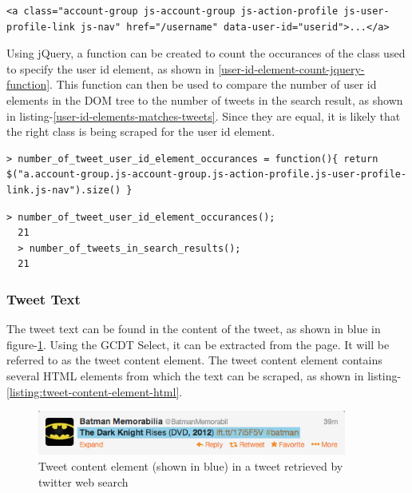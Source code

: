 \begin{lstlisting}[caption={HTML of the user id element in a tweet},label={listing:user-id-element-html},captionpos=b]
  <a class="account-group js-account-group js-action-profile js-user-profile-link js-nav" href="/username" data-user-id="userid">...</a>
\end{lstlisting}

\noindent
Using jQuery, a function can be created to count the occurances of the class used to specify the user id element, as shown in \ref{user-id-element-count-jquery-function}. This function can then be used to compare the number of user id elements in the DOM tree to the number of tweets in the search result, as shown in listing-\ref{user-id-elements-matches-tweets}. Since they are equal, it is likely that the right class is being scraped for the user id element.

\begin{lstlisting}[caption={Creating a function in GCDT Javascript Console for counting the occurance of user id elements on the twitter search result page},label={user-id-element-count-jquery-function},captionpos=b]
  > number_of_tweet_user_id_element_occurances = function(){ return $("a.account-group.js-account-group.js-action-profile.js-user-profile-link.js-nav").size() }
\end{lstlisting}

\begin{lstlisting}[caption={Running functions in GCDT Javascript Console to show that the number of user id elements matches the number of tweets},label={user-id-elements-matches-tweets},captionpos=b]
  > number_of_tweet_user_id_element_occurances();
  21
  > number_of_tweets_in_search_results();
  21
\end{lstlisting}

\subsubsection{Tweet Text}
The tweet text can be found in the content of the tweet, as shown in blue in figure-\ref{figure:tweet-text-field}. Using the GCDT Select, it can be extracted from the page. It will be referred to as the tweet content element. The tweet content element contains several HTML elements from which the text can be scraped, as shown in listing-\ref{listing:tweet-content-element-html}.

  \begin{figure}[H]
\includegraphics[width=4in]{image/tweet-text-and-url-field.png}
\centering
\caption{Tweet content element (shown in blue) in a tweet retrieved by twitter web search}
\label{figure:tweet-text-field}
\end{figure}

